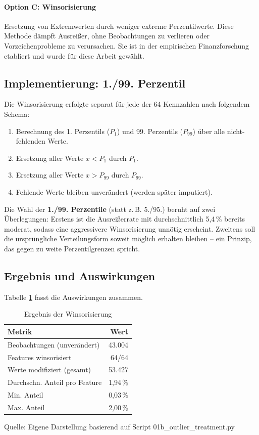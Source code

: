 \paragraph{Option C: Winsorisierung} Ersetzung von Extremwerten durch weniger extreme Perzentilwerte. Diese Methode dämpft Ausreißer, ohne Beobachtungen zu verlieren oder Vorzeichenprobleme zu verursachen. Sie ist in der empirischen Finanzforschung etabliert und wurde für diese Arbeit gewählt.

\subsection{Implementierung: 1./99. Perzentil}

Die Winsorisierung erfolgte separat für jede der 64 Kennzahlen nach folgendem Schema:

\begin{enumerate}[topsep=0.2\baselineskip]
    \item Berechnung des 1. Perzentils ($P_1$) und 99. Perzentils ($P_{99}$) über alle nicht-fehlenden Werte.
    \item Ersetzung aller Werte $x < P_1$ durch $P_1$.
    \item Ersetzung aller Werte $x > P_{99}$ durch $P_{99}$.
    \item Fehlende Werte bleiben unverändert (werden später imputiert).
\end{enumerate}

Die Wahl der \textbf{1./99. Perzentile} (statt z.\,B. 5./95.) beruht auf zwei Überlegungen: Erstens ist die Ausreißerrate mit durchschnittlich 5,4\,\% bereits moderat, sodass eine aggressivere Winsorisierung unnötig erscheint. Zweitens soll die ursprüngliche Verteilungsform soweit möglich erhalten bleiben – ein Prinzip, das gegen zu weite Perzentilgrenzen spricht.

\subsection{Ergebnis und Auswirkungen}

Tabelle \ref{tab:winsorisierung} fasst die Auswirkungen zusammen.

\begin{table}[htbp]
\centering
\caption{Ergebnis der Winsorisierung}
\label{tab:winsorisierung}
\begin{tabular}{lr}
\toprule
\textbf{Metrik} & \textbf{Wert} \\
\midrule
Beobachtungen (unverändert) & 43.004 \\
Features winsorisiert & 64/64 \\
Werte modifiziert (gesamt) & 53.427 \\
Durchschn. Anteil pro Feature & 1,94\,\% \\
Min. Anteil & 0,03\,\% \\
Max. Anteil & 2,00\,\% \\
\bottomrule
\end{tabular}
\par\smallskip
{\footnotesize Quelle: Eigene Darstellung basierend auf Script 01b\_outlier\_treatment.py}
\end{table}

